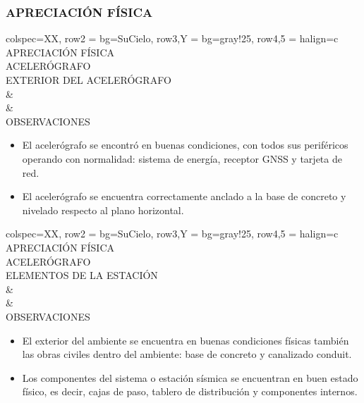 \subsubsection{APRECIACIÓN FÍSICA}
\begin{tblr}{
        colspec={XX},
        row{2} = {bg=SuCielo},
        row{3,Y} = {bg=gray!25},
        row{4,5} = {halign=c}
    }
     APRECIACIÓN FÍSICA \\
     ACELERÓGRAFO \MakeUppercase{} \\
     EXTERIOR DEL ACELERÓGRAFO \\
     &
     \\
     &
     \\
     OBSERVACIONES \\
     \begin{itemize}
        \item El acelerógrafo se encontró en buenas condiciones, con todos sus periféricos operando con normalidad: sistema de energía, receptor GNSS y tarjeta de red.
        \item El acelerógrafo se encuentra correctamente anclado a la base de concreto y nivelado respecto al plano horizontal.
    \end{itemize}
\end{tblr}
\newpage
\begin{tblr}{
        colspec={XX},
        row{2} = {bg=SuCielo},
        row{3,Y} = {bg=gray!25},
        row{4,5} = {halign=c}
    }
     APRECIACIÓN FÍSICA \\
     ACELERÓGRAFO \MakeUppercase{} \\
     ELEMENTOS DE LA ESTACIÓN \\
     &
     \\
     &
     \\
     OBSERVACIONES \\
     \begin{itemize}
        \item El exterior del ambiente se encuentra en buenas condiciones físicas también las obras civiles dentro del ambiente: base de concreto y canalizado conduit.
        \item Los componentes del sistema o estación sísmica se encuentran en buen estado físico, es decir, cajas de paso, tablero de distribución y componentes internos.
    \end{itemize}
\end{tblr}
